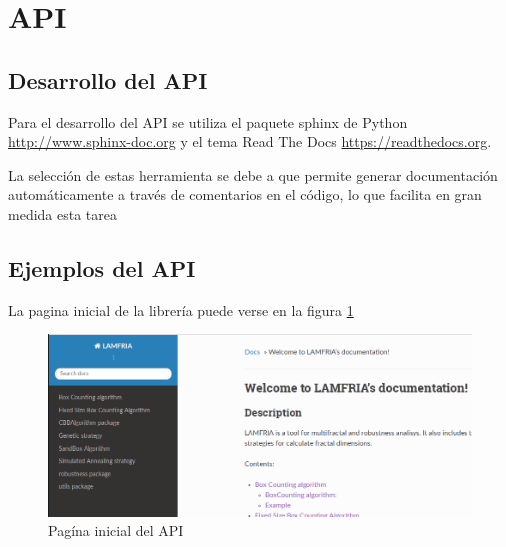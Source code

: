 \section{API}

\subsection{Desarrollo del API}

Para el desarrollo del API se utiliza el paquete sphinx de Python \url{http://www.sphinx-doc.org} y el tema Read The Docs \url{https://readthedocs.org}.

La selección de estas herramienta se debe a que permite generar documentación automáticamente a través de comentarios en el código, lo que facilita en gran medida esta tarea

\subsection{Ejemplos del API}

La pagina inicial de la librería puede verse en la figura  \ref{fig:lamfriaA}

\begin{figure}[H]
    \centering
    \includegraphics[scale=0.5]{Capitulo7Libreria/imagenes/lamfriaA.png}
    \caption{Pagína inicial del API}
    \label{fig:lamfriaA}
\end{figure}